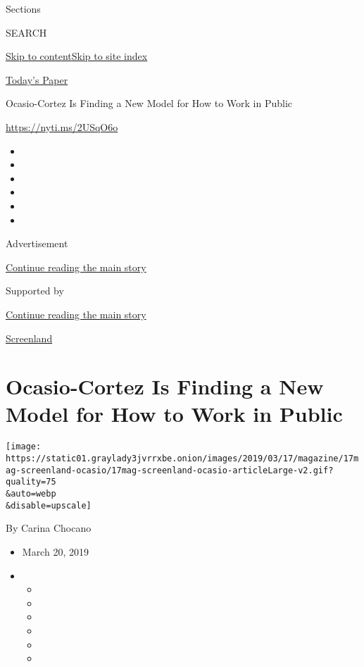 Sections

SEARCH

\protect\hyperlink{site-content}{Skip to
content}\protect\hyperlink{site-index}{Skip to site index}

\href{https://myaccount.nytimes3xbfgragh.onion/auth/login?response_type=cookie\&client_id=vi}{}

\href{https://www.nytimes3xbfgragh.onion/section/todayspaper}{Today's
Paper}

Ocasio-Cortez Is Finding a New Model for How to Work in Public

\url{https://nyti.ms/2USqO6o}

\begin{itemize}
\item
\item
\item
\item
\item
\item
\end{itemize}

Advertisement

\protect\hyperlink{after-top}{Continue reading the main story}

Supported by

\protect\hyperlink{after-sponsor}{Continue reading the main story}

\href{/column/screenland}{Screenland}

\hypertarget{ocasio-cortez-is-finding-a-new-model-for-how-to-work-in-public}{%
\section{Ocasio-Cortez Is Finding a New Model for How to Work in
Public}\label{ocasio-cortez-is-finding-a-new-model-for-how-to-work-in-public}}

\texttt{[image: https://static01.graylady3jvrrxbe.onion/images/2019/03/17/magazine/17mag-screenland-ocasio/17mag-screenland-ocasio-articleLarge-v2.gif?quality=75\\\&auto=webp\\\&disable=upscale]}

By Carina Chocano

\begin{itemize}
\item
  March 20, 2019
\item
  \begin{itemize}
  \item
  \item
  \item
  \item
  \item
  \item
  \end{itemize}
\end{itemize}

